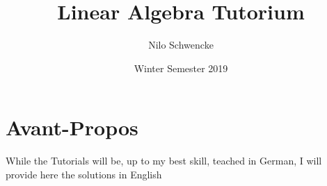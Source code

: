 \documentclass[a4paper,10pt]{book}
\title{Linear Algebra Tutorium}
\author{Nilo Schwencke}
\date{Winter Semester 2019}
\begin{document}
\maketitle

\section{Avant-Propos}

While the Tutorials will be, up to my best skill, teached in German, I will provide here the solutions in English


\end{document}
